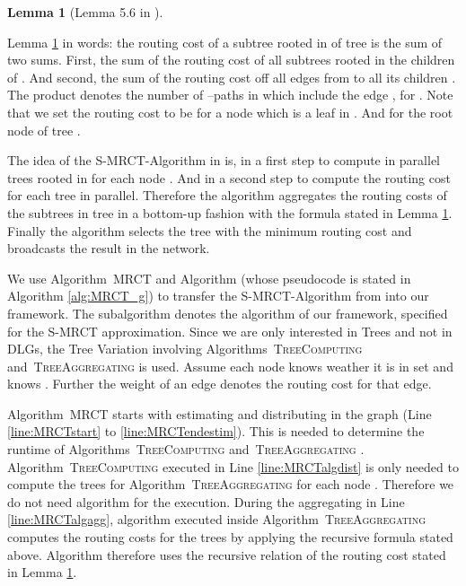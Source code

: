 \documentclass[11pt]{article}
\newtheorem{lemma}[theorem]{Lemma}
\newcommand{\todoI}[1]{}\newcommand{\blueI}[1]{}
\newif\iffull
\begin{document}
\begin{lemma}[Lemma 5.6 in \cite{hochuli:holzer:MRCST}]\label{lemma:recRC}

\end{lemma}

Lemma \ref{lemma:recRC} in words: the routing cost  of a subtree  rooted in  of tree  is the sum of two sums. First, the sum of the routing cost  of all subtrees  rooted in the children  of . And second, the sum of the routing cost off all edges  from  to all its children . The product  denotes the number of --paths in  which include the edge , for . Note that we set the routing cost  to be  for a node  which is a leaf in . And  for the root node  of tree \todoI{Notation anpassen}.

The idea of the S-MRCT-Algorithm in \cite{hochuli:holzer:MRCST} is, in a first step to compute in parallel  trees  rooted in  for each node . And in a second step to compute the routing cost  for each tree  in parallel. Therefore the algorithm aggregates the routing costs  of the subtrees  in tree  in a bottom-up fashion with the formula stated in Lemma \ref{lemma:recRC}. Finally the algorithm selects the tree  with the minimum routing cost  and broadcasts the result in the network.

We use Algorithm\iffull~\ref{alg:MRCT}\fi~\textsc{MRCT}  and Algorithm  (whose pseudocode is stated in Algorithm \ref{alg:MRCT_g}) to transfer the S-MRCT-Algorithm from \cite{hochuli:holzer:MRCST} into our framework. The subalgorithm  denotes the algorithm  of our framework, specified for the S-MRCT approximation.
Since we are only interested in Trees and not in DLGs, the Tree Variation involving Algorithms\iffull~\ref{alg:TreeComputing}\fi~\textsc{TreeComputing}  and\iffull~\ref{alg:TreeAggregating}\fi~\textsc{TreeAggregating}  is used. 
Assume each node  knows weather it is in set  and  knows . Further the weight of an edge denotes the routing cost for that edge.

Algorithm\iffull~\ref{alg:MRCT}\fi~\textsc{MRCT}  starts with estimating and distributing  in the graph (Line \ref{line:MRCTstart} to \ref{line:MRCTendestim}). This is needed to determine the runtime of Algorithms\iffull~\ref{alg:TreeComputing}\fi~\textsc{TreeComputing}  and\iffull~\ref{alg:TreeAggregating}\fi~\textsc{TreeAggregating} . Algorithm\iffull~\ref{alg:TreeComputing}\fi~\textsc{TreeComputing}  executed in Line \ref{line:MRCTalgdist} is only needed to compute the trees  for Algorithm\iffull~\ref{alg:TreeAggregating}\fi~\textsc{TreeAggregating}  for each node . Therefore we do not need algorithm  for the execution. During the aggregating in Line \ref{line:MRCTalgagg}, algorithm  executed inside Algorithm\iffull~\ref{alg:TreeAggregating}\fi~\textsc{TreeAggregating}  computes the routing costs for the trees  by applying the recursive formula stated above. Algorithm  therefore uses the recursive relation of the routing cost stated in Lemma \ref{lemma:recRC}.
\end{document}
